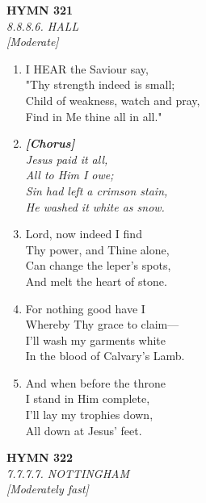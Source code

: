 \newpage
\begin{center}
    {\Large \textbf{HYMN 321}}
    \\
    \textit{8.8.8.6. HALL}
    \\
    \textit{\small [Moderate]}
\end{center}
\vspace{1em}

\begin{enumerate}
    \item I HEAR the Saviour say, \\
        "Thy strength indeed is small; \\
        Child of weakness, watch and pray, \\
        Find in Me thine all in all."

    \item[] \vspace{0.4em}
    \textbf{\textit{[Chorus]}} \\
    \textit{Jesus paid it all,} \\
    \textit{All to Him I owe;} \\
    \textit{Sin had left a crimson stain,} \\
    \textit{He washed it white as snow.}
    \vspace{0.4em}

    \item Lord, now indeed I find \\
        Thy power, and Thine alone, \\
        Can change the leper's spots, \\
        And melt the heart of stone.

    \item For nothing good have I \\
        Whereby Thy grace to claim--- \\
        I'll wash my garments white \\
        In the blood of Calvary's Lamb.

    \item And when before the throne \\
        I stand in Him complete, \\
        I'll lay my trophies down, \\
        All down at Jesus' feet.

\end{enumerate}

\newpage
\begin{center}
    {\Large \textbf{HYMN 322}}
    \\
    \textit{7.7.7.7. NOTTINGHAM}
    \\
    \textit{\small [Moderately fast]}
\end{center}
\vspace{1em}

